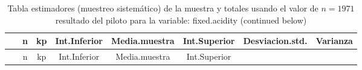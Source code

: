 \documentclass[
]{article}
\begin{document}
\begin{longtable}[]{@{}cccccccc@{}}
\caption{Tabla estimadores (muestreo sistemático) de la muestra y
totales usando el valor de \(n = 1971\) resultado del piloto para la
variable: fixed.acidity (continued below)}\tabularnewline
\toprule
\begin{minipage}[b]{0.18\columnwidth}\centering
~\strut
\end{minipage} & \begin{minipage}[b]{0.05\columnwidth}\centering
n\strut
\end{minipage} & \begin{minipage}[b]{0.03\columnwidth}\centering
kp\strut
\end{minipage} & \begin{minipage}[b]{0.10\columnwidth}\centering
Int.Inferior\strut
\end{minipage} & \begin{minipage}[b]{0.11\columnwidth}\centering
Media.muestra\strut
\end{minipage} & \begin{minipage}[b]{0.10\columnwidth}\centering
Int.Superior\strut
\end{minipage} & \begin{minipage}[b]{0.12\columnwidth}\centering
Desviacion.std.\strut
\end{minipage} & \begin{minipage}[b]{0.08\columnwidth}\centering
Varianza\strut
\end{minipage}\tabularnewline
\midrule
\endfirsthead
\toprule
\begin{minipage}[b]{0.18\columnwidth}\centering
~\strut
\end{minipage} & \begin{minipage}[b]{0.05\columnwidth}\centering
n\strut
\end{minipage} & \begin{minipage}[b]{0.03\columnwidth}\centering
kp\strut
\end{minipage} & \begin{minipage}[b]{0.10\columnwidth}\centering
Int.Inferior\strut
\end{minipage} & \begin{minipage}[b]{0.11\columnwidth}\centering
Media.muestra\strut
\end{minipage} & \begin{minipage}[b]{0.10\columnwidth}\centering
Int.Superior\strut
\end{minipage} & \begin{minipage}[b]{0.12\columnwidth}\centering

\end{minipage}
\end{longtable}
\end{document}
